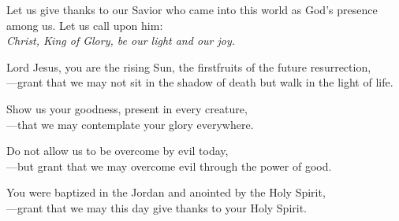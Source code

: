 \intercessions

\begin{raggedright}
Let us give thanks to our Savior who came into this world as God’s presence among us. Let us call upon him:\\
\emph{Christ, King of Glory, be our light and our joy.}

\medskip
Lord Jesus, you are the rising Sun, the firstfruits of the future resurrection,\\
{\color{red}---}grant that we may not sit in the shadow of death but walk in the light of life.

\medskip
Show us your goodness, present in every creature,\\
{\color{red}---}that we may contemplate your glory everywhere.

\medskip
Do not allow us to be overcome by evil today,\\
{\color{red}---}but grant that we may overcome evil through the power of good.

\medskip
You were baptized in the Jordan and anointed by the Holy Spirit,\\
{\color{red}---}grant that we may this day give thanks to your Holy Spirit.
\end{raggedright}